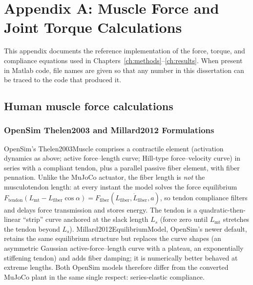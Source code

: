 \chapter{Appendix A: Muscle Force and Joint Torque Calculations}\label{app:muscle_calcs}
\graphicspath{{./figs/AppendixA/}{./figs/Aim1/}{./figs/Aim2/}{./figs/Preliminary/}}

This appendix documents the reference implementation of the force, torque, and compliance equations used in Chapters~\ref{ch:methods}--\ref{ch:results}. When present in Matlab code, file names are given so that any number in this dissertation can be traced to the code that produced it.

\section{Human muscle force calculations}
\subsection{OpenSim Thelen2003 and Millard2012 Formulations}

OpenSim's Thelen2003Muscle comprises a contractile element (activation
dynamics as above; active force--length curve; Hill-type force--velocity
curve) in series with a compliant tendon, plus a parallel passive fiber
element, with fiber pennation. Unlike the MuJoCo actuator, the fiber
length is \emph{not} the musculotendon length: at every instant the
model solves the force equilibrium
$F_{\text{tendon}}(L_{\text{mt}} - L_{\text{fiber}}\cos\alpha)
 = F_{\text{fiber}}(L_{\text{fiber}}, \dot{L}_{\text{fiber}}, a)$,
so tendon compliance filters and delays force transmission and stores
energy. The tendon is a quadratic-then-linear ``strip'' curve anchored
at the slack length $L_s$ (force zero until $L_{\text{mt}}$ stretches
the tendon beyond $L_s$). Millard2012EquilibriumModel, OpenSim's newer
default, retains the same equilibrium structure but replaces the curve
shapes (an asymmetric Gaussian active-force--length curve with a
plateau, an exponentially stiffening tendon) and adds fiber damping; it
is numerically better behaved at extreme lengths. Both OpenSim models
therefore differ from the converted MuJoCo plant in the same single
respect: series-elastic compliance.

